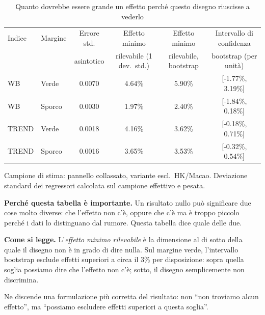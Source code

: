 \begin{table}[htbp]
\centering
\footnotesize
\caption{Quanto dovrebbe essere grande un effetto perch\'e questo disegno riuscisse a vederlo}
\label{tab:mde}
\begin{threeparttable}
\begin{tabular}{llcccc}
\toprule
Indice & Margine & Errore std. & Effetto minimo & Effetto minimo & Intervallo di confidenza \\
 & & asintotico & rilevabile (1 dev.\ std.) & rilevabile, bootstrap & bootstrap (per unit\`a) \\
\midrule
WB & Verde & 0.0070 & 4.64\% & 5.90\% & [-1.77\%, 3.19\%] \\
WB & Sporco & 0.0030 & 1.97\% & 2.40\% & [-1.84\%, 0.18\%] \\
TREND & Verde & 0.0018 & 4.16\% & 3.62\% & [-0.18\%, 0.71\%] \\
TREND & Sporco & 0.0016 & 3.65\% & 3.53\% & [-0.32\%, 0.54\%] \\
\bottomrule
\end{tabular}
\begin{tablenotes}[flushleft]\footnotesize
\item Campione di stima: pannello collassato, variante escl.\ HK/Macao. Deviazione standard dei regressori calcolata sul campione effettivo e pesata.
\item \textbf{Perch\'e questa tabella \`e importante.} Un risultato nullo pu\`o significare due cose molto diverse: che l'effetto non c'\`e, oppure che c'\`e ma \`e troppo piccolo perch\'e i dati lo distinguano dal rumore. Questa tabella dice quale delle due.
\item \textbf{Come si legge.} L'\emph{effetto minimo rilevabile} \`e la dimensione al di sotto della quale il disegno non \`e in grado di dire nulla. Sul margine verde, l'intervallo bootstrap esclude effetti superiori a circa il 3\% per disposizione: sopra quella soglia possiamo dire che l'effetto non c'\`e; sotto, il disegno semplicemente non discrimina.
\item Ne discende una formulazione pi\`u corretta del risultato: non ``non troviamo alcun effetto'', ma ``possiamo escludere effetti superiori a questa soglia''.
\end{tablenotes}
\end{threeparttable}
\end{table}
